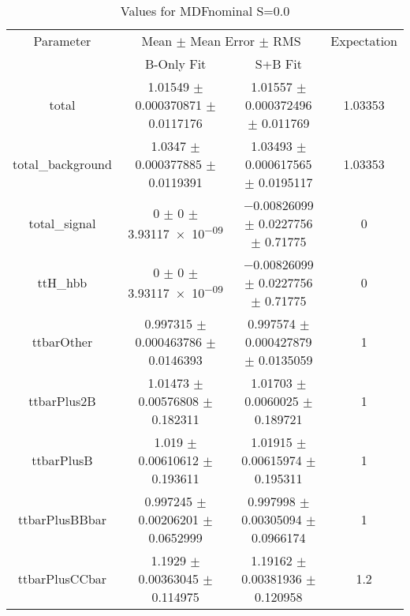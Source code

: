 \begin{table}
\centering
\caption{Values for MDFnominal S=0.0}
\begin{tabular}{cccc}
\toprule
Parameter & \multicolumn{2}{c}{Mean $\pm$ Mean Error $\pm$ RMS} & Expectation\\
 & B-Only Fit & S+B Fit & \\
\midrule
total & \num{1.01549} $\pm$ \num{0.000370871} $\pm$ \num{0.0117176} & \num{1.01557} $\pm$ \num{0.000372496} $\pm$ \num{0.011769} & \num{1.03353}\\
total\_background & \num{1.0347} $\pm$ \num{0.000377885} $\pm$ \num{0.0119391} & \num{1.03493} $\pm$ \num{0.000617565} $\pm$ \num{0.0195117} & \num{1.03353}\\
total\_signal & \num{0} $\pm$ \num{0} $\pm$ \num{3.93117e-09} & \num{-0.00826099} $\pm$ \num{0.0227756} $\pm$ \num{0.71775} & \num{0}\\
ttH\_hbb & \num{0} $\pm$ \num{0} $\pm$ \num{3.93117e-09} & \num{-0.00826099} $\pm$ \num{0.0227756} $\pm$ \num{0.71775} & \num{0}\\
ttbarOther & \num{0.997315} $\pm$ \num{0.000463786} $\pm$ \num{0.0146393} & \num{0.997574} $\pm$ \num{0.000427879} $\pm$ \num{0.0135059} & \num{1}\\
ttbarPlus2B & \num{1.01473} $\pm$ \num{0.00576808} $\pm$ \num{0.182311} & \num{1.01703} $\pm$ \num{0.0060025} $\pm$ \num{0.189721} & \num{1}\\
ttbarPlusB & \num{1.019} $\pm$ \num{0.00610612} $\pm$ \num{0.193611} & \num{1.01915} $\pm$ \num{0.00615974} $\pm$ \num{0.195311} & \num{1}\\
ttbarPlusBBbar & \num{0.997245} $\pm$ \num{0.00206201} $\pm$ \num{0.0652999} & \num{0.997998} $\pm$ \num{0.00305094} $\pm$ \num{0.0966174} & \num{1}\\
ttbarPlusCCbar & \num{1.1929} $\pm$ \num{0.00363045} $\pm$ \num{0.114975} & \num{1.19162} $\pm$ \num{0.00381936} $\pm$ \num{0.120958} & \num{1.2}\\
\bottomrule
\end{tabular}
\end{table}